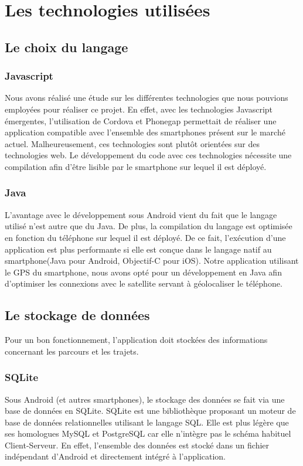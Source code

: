\chapter{Les technologies utilisées}
\section{Le choix du langage}

\subsection{Javascript}
Nous avons réalisé une étude sur les différentes technologies que nous pouvions employées pour réaliser ce projet. En effet, avec les technologies Javascript émergentes, l'utilisation de Cordova et Phonegap permettait de réaliser une application compatible avec l'ensemble des smartphones présent sur le marché actuel. Malheureusement, ces technologies sont plutôt orientées sur des technologies web. Le développement du code avec ces technologies nécessite une compilation afin d'être lisible par le smartphone sur lequel il est déployé. 

\subsection{Java}
L'avantage avec le développement sous Android vient du fait que le langage utilisé n'est autre que du Java. De plus, la compilation du langage est optimisée en fonction du téléphone sur lequel il est déployé. De ce fait, l’exécution d'une application est plus performante si elle est conçue dans le langage natif au smartphone(Java pour Android, Objectif-C pour iOS). Notre application utilisant le GPS du smartphone, nous avons opté pour un développement en Java afin d'optimiser les connexions avec le satellite servant à géolocaliser le téléphone.

\section{Le stockage de données}
Pour un bon fonctionnement, l'application doit stockées des informations concernant les parcours et les trajets. 

\subsection{SQLite}
Sous Android (et autres smartphones), le stockage des données se fait via une base de données en SQLite. SQLite est une bibliothèque proposant un moteur de base de données relationnelles utilisant le langage SQL. Elle est plus légère que ses homologues MySQL et PostgreSQL car elle n'intègre pas le schéma habituel Client-Serveur. En effet, l'ensemble des données est stocké dans un fichier indépendant d'Android et directement intégré à l'application.

